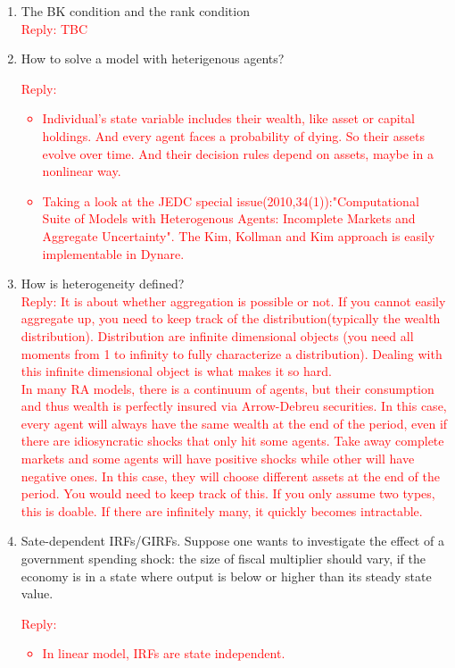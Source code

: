 \documentclass[cn,10pt,math=newtx,citestyle=gb7714-2015,bibstyle=gb7714-2015]{elegantbook}
\begin{document}
{{\begin{enumerate}
		\item The BK condition and the rank condition\\
		\textcolor{red}{Reply: TBC}
		\item How to solve a model with heterigenous agents?\\
		\textcolor{red}{Reply:
			\begin{itemize}
				\item Individual's state variable includes their wealth, like asset or capital holdings. And every agent faces a probability of dying. So their assets evolve over time. And their decision rules depend on assets, maybe in a nonlinear way.
				\item Taking a look at the JEDC special issue(2010,34(1)):"Computational Suite of Models with Heterogenous Agents: Incomplete Markets and Aggregate Uncertainty". The Kim, Kollman and Kim approach is easily implementable in Dynare.
			\end{itemize}
		}
		\item How is heterogeneity defined?\\
		\textcolor{red}{Reply: It is about whether aggregation is possible or not. If you cannot easily aggregate up, you need to keep track of the distribution(typically the wealth distribution). Distribution are infinite dimensional objects (you need all moments from 1 to infinity to fully characterize a distribution). Dealing with this infinite dimensional object is what makes it so hard.\\
			In many RA models, there is a continuum of agents, but their consumption and thus wealth is perfectly insured via Arrow-Debreu securities. In this case, every agent will always have the same wealth at the end of the period, even if there are idiosyncratic shocks that only hit some agents. Take away complete markets and some agents will have positive shocks while other will have negative ones. In this case, they will choose different assets at the end of the period. You would need to keep track of this. If you only assume two types, this is doable. If there are infinitely many, it quickly becomes intractable.}
		\item Sate-dependent IRFs/GIRFs. Suppose one wants to investigate the effect of a government spending shock: the size of fiscal multiplier should vary, if the economy is in a state where output is below or higher than its steady state value.\\
		\textcolor{red}{Reply:
			\begin{itemize}
				\item In linear model, IRFs are state independent.

\end{itemize}}
\end{enumerate}}}
\end{document}
